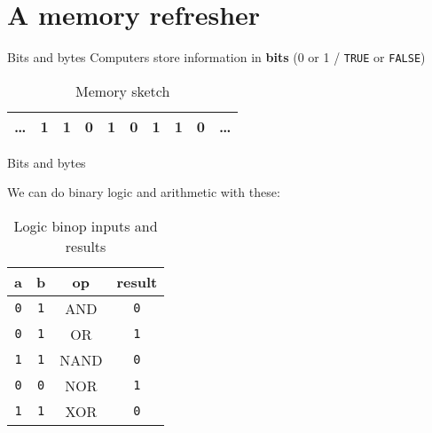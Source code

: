 \documentclass[../index.tex]{subfiles}
\begin{document}
\renewcommand{\sectiontitle}{A memory refresher}
\section{\sectiontitle}

\renewcommand{\currenttitle}{Bits and bytes}
\begin{frame}{\currenttitle}
%
  Computers store information in \textbf{bits} (0 or 1 / \texttt{TRUE} or \texttt{FALSE})
  \vspace*{2em}

  \begin{table}
    \centering
    \begin{tabular}{c|c|c|c|c|c|c|c|c|c}
      \hline
      \dots & 1 & 1 & 0 & 1 & 0 & 1 & 1 & 0 & \dots \\
      \hline
    \end{tabular}
    \caption{Memory sketch}
  \end{table}
\end{frame}

\begin{frame}{\currenttitle}
  \newcommand{\false}{\texttt{0}}
  \newcommand{\true}{\texttt{1}}

  We can do binary logic and arithmetic with these:

  \begin{table}
    \begin{tabular}{c c c c}
      a       & b       & op    & result  \\ \hline
      \false  & \true   & AND   & \false  \\ %
      \false  & \true   & OR    & \true   \\ %
      \true   & \true   & NAND  & \false  \\ %
      \false  & \false  & NOR   & \true   \\ %
      \true   & \true   & XOR   & \false     %
    \end{tabular}
    \caption{Logic binop inputs and results}
  \end{table}
\end{frame}
\end{document}

